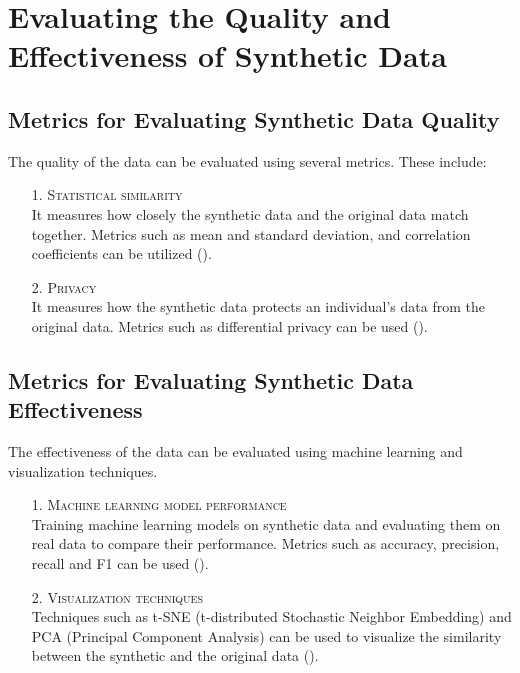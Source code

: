 \section{Evaluating the Quality and Effectiveness of Synthetic Data}

\subsection{Metrics for Evaluating Synthetic Data Quality}

The quality of the data can be evaluated using several metrics. These include:

\begin{itemize}
    \item[1.] \textsc{Statistical similarity} \\
    It measures how closely the synthetic data and the original data match together. Metrics such as mean and standard deviation, and correlation coefficients can be utilized (\cite{Snoke2018}).
    \item[2.] \textsc{Privacy} \\
    It measures how the synthetic data protects an individual's data from the original data. Metrics such as differential privacy can be used (\cite{Dwork2008}).
\end{itemize}

\subsection{Metrics for Evaluating Synthetic Data Effectiveness}

The effectiveness of the data can be evaluated using machine learning and visualization techniques.

\begin{itemize}
    \item[1.] \textsc{Machine learning model performance}\\ 
    Training machine learning models on synthetic data and evaluating them on real data to compare their performance. Metrics such as accuracy, precision, recall and F1 can be used (\cite{Chawla2002}).
    \item[2.] \textsc{Visualization techniques} \\
    Techniques such as t-SNE (t-distributed Stochastic Neighbor Embedding) and PCA (Principal Component Analysis) can be used to visualize the similarity between the synthetic and the original data (\cite{Maaten2008}).
\end{itemize}


